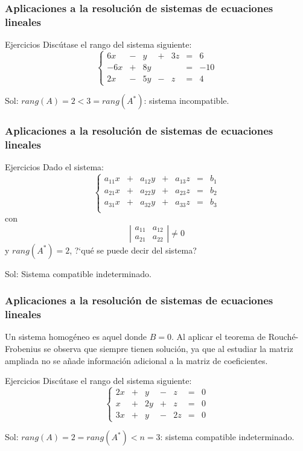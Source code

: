 \documentclass[aspectratio=169]{beamer}
\begin{document}
     \begin{frame}
  \frametitle{Aplicaciones a la resoluci\'on de sistemas de ecuaciones lineales}
     \begin{block}{Ejercicios}
Disc\'utase el rango del sistema siguiente:
\[
\left\{\begin{array}{ccccccc}6x & - & y & + & 3z & = & 6 \\-6x & + & 8y &   &   & = & -10 \\2x & - & 5y & - & z & = & 4\end{array}\right.
\]
\end{block}
Sol: $rang(A)=2<3=rang(A^*)$: sistema incompatible.
\end{frame} 
  
  
  
       \begin{frame}
  \frametitle{Aplicaciones a la resoluci\'on de sistemas de ecuaciones lineales}
     \begin{block}{Ejercicios}
Dado el sistema: 
\[
\left\{\begin{array}{ccccccc}
a_{11}x &+ & a_{12}y & + & a_{13}z & = & b_1 \\
a_{21}x &+ & a_{22}y & + & a_{23}z & = & b_2 \\
a_{31}x &+ & a_{32}y & + & a_{33}z & = & b_3 \\
\end{array}\right.
\]
con 
\[\left|
\begin{array}{cc}
a_{11}&a_{12}\\a_{21}&a_{22}
\end{array}
\right|\neq0\]
y $rang(A^*) = 2$, ?`qu\'e se puede decir del sistema?
\end{block}
Sol: Sistema compatible indeterminado.
\end{frame} 
  
  
       \begin{frame}
  \frametitle{Aplicaciones a la resoluci\'on de sistemas de ecuaciones lineales}
  Un sistema homog\'eneo es aquel donde $B=0$. Al aplicar el teorema de Rouch\'e-Frobenius se observa que siempre tienen soluci\'on, ya que al estudiar la matriz ampliada no se a\~nade informaci\'on adicional a la matriz de coeficientes.
     \begin{block}{Ejercicios}
Disc\'utase el rango del sistema siguiente:
\[
\left\{\begin{array}{ccccccc}2x & + & y & - & z & = & 0 \\
x & + & 2y & +  & z  & = & 0 \\
3x & + & y & - & 2z & = & 0\end{array}\right.
\]
\end{block}
Sol: $rang(A)=2=rang(A^*)<n=3$: sistema compatible indeterminado.
\end{frame} 
  
\end{document}
